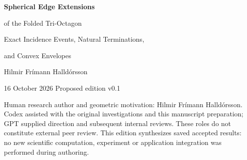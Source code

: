 \documentclass[11pt,a4paper]{article}
\begin{document}
\hypersetup{pageanchor=false}
\begin{titlepage}
{\color{ink}\Huge\bfseries Spherical Edge Extensions\par of the Folded Tri-Octagon\par}
\vspace{7mm}
{\Large Exact Incidence Events, Natural Terminations,\par and Convex Envelopes\par}
\vspace{12mm}
{\large Hilmir Fr\'imann Halld\'orsson\par}
16 October 2026 \quad Proposed edition v0.1
\vspace{10mm}
\begin{abstract}
Three welded regular octagonal panels determine 21 straight supporting lines. We give a unified account of the accepted BOUNDARY-10, BOUNDARY-11 and BOUNDARY-12 investigations of this fixed arrangement. Every line is tangent at its original edge midpoint to one concentric sphere. Extension to an observer sphere therefore has a common along-line parameter. Exactly three finite radii produce coincidences: each has 18 distinct points carrying 42 branch labels, whereas all other allowed finite radii have 42 distinct positions. The full finite symmetry is exactly $D_{3h}$.

The two nonoriginal events are, on every outward ray, respectively the first subsequent meeting and the last finite meeting with another original line. At the first, the entire clipped segment equals the original panel width; at the last, each endpoint's added extension equals that width. Splitting at all spatial intersections produces three connected frameworks with 21, 63 and 105 edges. Their separately defined convex envelopes have 11, 32 and 20 maximal faces. We give proofs, coordinates, incidence conventions and exact supporting-plane representatives, and explain why the later frameworks lie inside their envelopes instead of tracing their surfaces.

Uniform similarity, display units and variation of observer radius are separated. A centred decagonal prism and previously documented scalar identities involving $10$ and $\pi e\ph$ provide optional context; no fitted correspondence or physical boundary is adopted. The accompanying research edition preserves the accepted evidence, complete internal reviews and unchanged observation prototype, including its known numerical-input limitation V01.
\end{abstract}
\vfill
\small Human research author and geometric motivation: Hilmir Fr\'imann Halld\'orsson. Codex assisted with the original investigations and this manuscript preparation; GPT supplied direction and subsequent internal reviews. These roles do not constitute external peer review. This edition synthesizes saved accepted results: no new scientific computation, experiment or application integration was performed during authoring.
\end{titlepage}
\hypersetup{pageanchor=true}
\tableofcontents\clearpage{}
\end{document}
